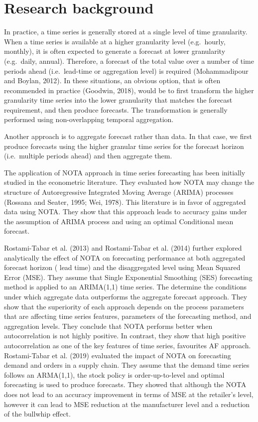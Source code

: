 \documentclass[]{elsarticle} %
\begin{document}
\hypertarget{lit}{%
\section{Research background}\label{lit}}

In practice, a time series is generally stored at a single level of time
granularity. When a time series is available at a higher granularity
level (e.g.~hourly, monthly), it is often expected to generate a
forecast at lower granularity (e.g.~daily, annual). Therefore, a
forecast of the total value over a number of time periods ahead
(i.e.~lead-time or aggregation level) is required (Mohammadipour and
Boylan, 2012). In these situations, an obvious option, that is often
recommended in practice (Goodwin, 2018), would be to first transform the
higher granularity time series into the lower granularity that matches
the forecast requirement, and then produce forecasts. The transformation
is generally performed using non-overlapping temporal aggregation.

Another approach is to aggregate forecast rather than data. In that
case, we first produce forecasts using the higher granular time series
for the forecast horizon (i.e.~multiple periods ahead) and then
aggregate them.

The application of NOTA approach in time series forecasting has been
initially studied in the econometric literature. They evaluated how NOTA
may change the structure of Autoregressive Integrated Moving Average
(ARIMA) processes (Rossana and Seater, 1995; Wei, 1978). This literature
is in favor of aggregated data using NOTA. They show that this approach
leads to accuracy gains under the assumption of ARIMA process and using
an optimal Conditional mean forecast.

Rostami-Tabar et al. (2013) and Rostami-Tabar et al. (2014) further
explored analytically the effect of NOTA on forecasting performance at
both aggregated forecast horizon ( lead time) and the disaggregated
level using Mean Squared Error (MSE). They assume that Single
Exponential Smoothing (SES) forecasting method is applied to an
ARIMA(1,1) time series. The determine the conditions under which
aggregate data outperforms the aggregate forecast approach. They show
that the superiority of each approach depends on the process parameters
that are affecting time series features, parameters of the forecasting
method, and aggregation levels. They conclude that NOTA performs better
when autocorrelation is not highly positive. In contrast, they show that
high positive autocorrelation as one of the key features of time series,
favourites AF approach. Rostami-Tabar et al. (2019) evaluated the impact
of NOTA on forecasting demand and orders in a supply chain. They assume
that the demand time series follows an ARMA(1,1), the stock policy is
order-up-to-level and optimal forecasting is used to produce forecasts.
They showed that although the NOTA does not lead to an accuracy
improvement in terms of MSE at the retailer's level, however it can lead
to MSE reduction at the manufacturer level and a reduction of the
bullwhip effect.
\end{document}
